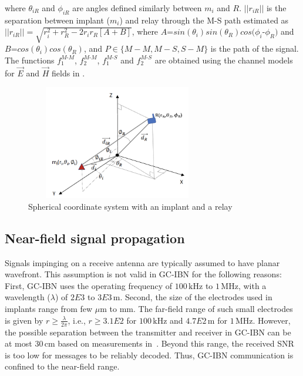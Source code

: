 where $\theta_{iR}$ and $\phi_{iR}$ are angles defined similarly between $m_i$ and $R$. $||r_{iR}||$ is the separation between implant ($m_i$) and relay through the M-S path estimated as $||r_{iR}||=\sqrt{r_i^2+r_R^2-2r_ir_R[A+B]}$, 
where $A$=$sin(\theta_i)sin(\theta_R)cos(\phi_i$-$\phi_R)$ and $B$=$cos(\theta_i)cos(\theta_R)$, and $P \in \{M-M,M-S,S-M\}$ is the path of the signal. The functions $f_1^{M\text{-}M}$, $f_2^{M\text{-}M}$, $f_1^{M\text{-}S}$ and $f_2^{M\text{-}S}$ are obtained using the channel models for $\overrightarrow{E}$ and $\overrightarrow{H}$ fields in \cite{tbiocas}.
\begin{figure}[t]
 \centering
\includegraphics[width=8cm,height=5cm]{figures/GC_beamforming/angles.png}  
 \vspace{-3mm}
 \caption{\label{fig:angles} Spherical coordinate system with an implant and a relay}
  \vspace{-7mm}
  \end{figure}
  

\subsection{Near-field signal propagation}\label{nf} Signals impinging on a receive antenna are typically assumed to have planar wavefront. This assumption is not valid in GC-IBN for the following reasons: First,  GC-IBN uses the operating frequency of $100\,\mathrm{kHz}$ to $1\,\mathrm{MHz}$, with a wavelength ($\lambda$) of $2E3$ to $3E3\,\mathrm{m}$. Second, the size of the electrodes used in implants range from  few $\mu\mathrm{m}$ to $\mathrm{mm}$. 
The far-field range of such small electrodes is given by $r\geq \frac{\lambda}{2\pi}$, i.e.,  $r\geq 3.1E2$ for $100\,\mathrm{kHz}$ and $4.7E2\,\mathrm{m}$ for $1\,\mathrm{MHz}$. However, the possible separation between the transmitter and receiver in GC-IBN can be at most $30\,\mathrm{cm}$ based on measurements in~\cite{tbiocas}. Beyond this range, the received SNR is too low for messages to be reliably decoded. Thus, GC-IBN communication is confined to the near-field range.

